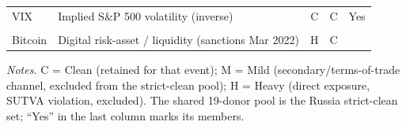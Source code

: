 \begin{table}[h]
\begin{threeparttable}
\begin{tabular}{@{}llccc@{}}
VIX         & Implied S\&P 500 volatility (inverse)          & C & C & Yes \\
\addlinespace
\multicolumn{5}{@{}l}{\textit{Crypto}}\\
Bitcoin     & Digital risk-asset / liquidity (sanctions Mar 2022) & H & C & \\
\bottomrule
\end{tabular}
\begin{tablenotes}[flushleft]
\footnotesize
\item \textit{Notes.} C = Clean (retained for that event); M = Mild (secondary/terms-of-trade channel, excluded from the strict-clean pool); H = Heavy (direct exposure, SUTVA violation, excluded). The shared 19-donor pool is the Russia strict-clean set; ``Yes'' in the last column marks its members.
\end{tablenotes}
\end{threeparttable}
\end{table}

